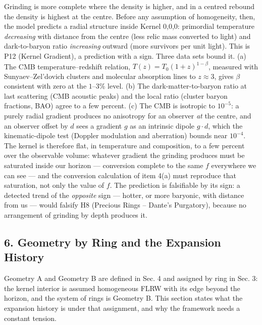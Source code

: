 \documentclass[
  11pt,
]{article}
\begin{document}
Grinding is more complete where the density is higher, and in a centred
rebound the density is highest at the centre. Before any assumption of
homogeneity, then, the model predicts a radial structure inside Kernel
0,0,0: primordial temperature \emph{decreasing} with distance from the
centre (less relic mass converted to light) and dark-to-baryon ratio
\emph{increasing} outward (more survivors per unit light). This is P12
(Kernel Gradient), a prediction with a sign. Three data sets bound it.
(a) The CMB temperature--redshift relation,
\(T(z) = T_0(1+z)^{1-\beta}\), measured with Sunyaev--Zel'dovich
clusters and molecular absorption lines to \(z \approx 3\), gives
\(\beta\) consistent with zero at the \(1\)--\(3\%\) level. (b) The
dark-matter-to-baryon ratio at last scattering (CMB acoustic peaks) and
the local ratio (cluster baryon fractions, BAO) agree to a few percent.
(c) The CMB is isotropic to \(10^{-5}\): a purely radial gradient
produces no anisotropy for an observer \emph{at} the centre, and an
observer offset by \(d\) sees a gradient \(g\) as an intrinsic dipole
\(g\cdot d\), which the kinematic-dipole test (Doppler modulation and
aberration) bounds near \(10^{-4}\). The kernel is therefore flat, in
temperature and composition, to a few percent over the observable
volume: whatever gradient the grinding produces must be saturated inside
our horizon --- conversion complete to the same \(f\) everywhere we can
see --- and the conversion calculation of item 4(a) must reproduce that
saturation, not only the value of \(f\). The prediction is falsifiable
by its sign: a detected trend of the \emph{opposite} sign --- hotter, or
more baryonic, with distance from us --- would falsify H8 (Precious
Rings -- Dante's Purgatory), because no arrangement of grinding by depth
produces it.

\hypertarget{geometry-by-ring-and-the-expansion-history}{%
\subsection{\texorpdfstring{\textbf{6. Geometry by Ring and the
Expansion
History}}{6. Geometry by Ring and the Expansion History}}\label{geometry-by-ring-and-the-expansion-history}}

Geometry A and Geometry B are defined in Sec. 4 and assigned by ring in
Sec. 3: the kernel interior is assumed homogeneous FLRW with its edge
beyond the horizon, and the system of rings is Geometry B. This section
states what the expansion history is under that assignment, and why the
framework needs a constant tension.
\end{document}
